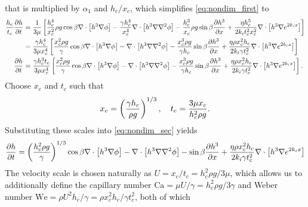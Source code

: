 that is multiplied by $\alpha_1$ and $h_c / x_c$, which simplifies \cref{eq:nondim_first} to 
\begin{align}
    \nonumber \frac{h_c}{t_c} \frac{\partial h}{\partial t} &= \frac{1}{3\mu} \left[ 
        \frac{h_c^4}{x_c^2} \rho g \cos \beta \nabla \cdot \left[ h^3\nabla\phi \right] - 
        \frac{\gamma h_c^4}{x_c^4} \nabla \cdot \left[ h^3 \nabla \nabla^2 \phi \right] - 
        \frac{h_c^3}{x_c} \rho g \sin\beta \frac{\partial h^3}{\partial x} + 
        \frac{\eta h_c^5}{2k_i t_c^2 x_c^2} \nabla \cdot \left[ h^3 \nabla e^{2k_i x} \right]
     \right]\\ 
    \nonumber &= \frac{\gamma h_c^4}{3\mu x_c^4} \left[ 
        \frac{x_c^2 \rho g}{\gamma} \cos \beta \nabla \cdot \left[ h^3\nabla\phi \right] - 
        \nabla \cdot \left[ h^3 \nabla \nabla^2 \phi \right] - 
        \frac{x_c^3 \rho g}{\gamma h_c} \sin\beta \frac{\partial h^3}{\partial x} + 
        \frac{\eta \rho x_c^2 h_c}{2k_i \gamma t_c^2} \nabla \cdot \left[ h^3 \nabla e^{2k_i x} \right]
     \right]\\
    \frac{\partial h}{\partial t} &= \frac{\gamma h_c^3 t_c}{3\mu x_c^4} \left[ 
        \frac{x_c^2 \rho g}{\gamma} \cos \beta \nabla \cdot \left[ h^3\nabla\phi \right] - 
        \nabla \cdot \left[ h^3 \nabla \nabla^2 \phi \right] - 
        \frac{x_c^3 \rho g}{\gamma h_c} \sin\beta \frac{\partial h^3}{\partial x} + 
        \frac{\eta \rho x_c^2 h_c}{2k_i \gamma t_c^2} \nabla \cdot \left[ h^3 \nabla e^{2k_i x} \right]
     \right].
    \label{eq:nondim_sec}
\end{align}
Choose $x_c$ and $t_c$ such that 
\begin{align}
    x_c = \left( \frac{\gamma h_c}{\rho g} \right)^{1/3}, \quad t_c = \frac{3\mu x_c}{h_c^2 \rho g}.
    \label{eq:x_and_t_scales}
\end{align}
Substituting these scales into \cref{eq:nondim_sec} yields
\begin{align}
    \frac{\partial h}{\partial t} = \left( \frac{h_c^2 \rho g}{\gamma} \right)^{1/3} \cos\beta \nabla \cdot \left[  h^3 \nabla \phi  \right] - 
    \nabla \cdot \left[ h^3 \nabla\nabla^2\phi  \right] - 
    \sin\beta \frac{\partial h^3}{\partial x} + 
    \frac{\eta \rho x_c^2 h_c}{2k_i \gamma t_c^2} \nabla \cdot \left[ h^3 \nabla e^{2k_i x} \right]
    \label{eq:nondim_third}
\end{align}  
The velocity scale is chosen naturally as $U = x_c/t_c = h_c^2\rho g/3\mu$,
which allows us to additionally define the capillary number $\mathrm{Ca} = \mu U / \gamma = h_c^2\rho g/3\gamma$
and Weber number $\mathrm{We} = \rho U^2 h_c / \gamma = \rho x_c^2 h_c / \gamma t_c^2$, both of which
